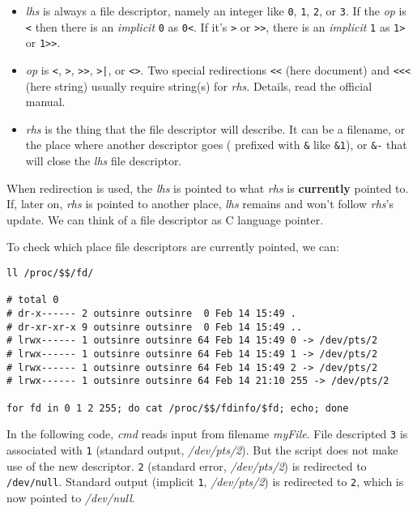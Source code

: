 \begin{itemize}
\item \textit{lhs} is always a file descriptor, namely an integer
  like \verb|0|, \verb|1|, \verb|2|, or \verb|3|. If the
  \textit{op} is \verb|<| then there is an \textit{implicit}
  \verb|0| as \verb|0<|. If it's \verb|>| or \verb|>>|, there is
  an \textit{implicit} \verb|1| as \verb|1>| or \verb|1>>|.
\item \textit{op} is \verb|<|, \verb|>|, \verb|>>|, \verb/>|/, or
  \verb|<>|. Two special redirections \verb|<<| (here document)
  and \verb|<<<| (here string) usually require string(s) for
  \textit{rhs}. Details, read the official manual.
\item \textit{rhs} is the thing that the file descriptor will
  describe. It can be a filename, or the place where another
  descriptor goes ( prefixed with \verb|&| like \lstinline|&1|),
  or \lstinline|&-| that will close the \textit{lhs} file
  descriptor.
\end{itemize}

When redirection is used, the \textit{lhs} is pointed to what
\textit{rhs} is \textbf{currently} pointed to. If, later on,
\textit{rhs} is pointed to another place, \textit{lhs} remains and
won't follow \textit{rhs}'s update. We can think of a file
descriptor as C language pointer.

To check which place file descriptors are currently pointed, we
can:

\begin{lstlisting}
ll /proc/$$/fd/

# total 0
# dr-x------ 2 outsinre outsinre  0 Feb 14 15:49 .
# dr-xr-xr-x 9 outsinre outsinre  0 Feb 14 15:49 ..
# lrwx------ 1 outsinre outsinre 64 Feb 14 15:49 0 -> /dev/pts/2
# lrwx------ 1 outsinre outsinre 64 Feb 14 15:49 1 -> /dev/pts/2
# lrwx------ 1 outsinre outsinre 64 Feb 14 15:49 2 -> /dev/pts/2
# lrwx------ 1 outsinre outsinre 64 Feb 14 21:10 255 -> /dev/pts/2

for fd in 0 1 2 255; do cat /proc/$$/fdinfo/$fd; echo; done
\end{lstlisting}

In the following code, \textit{cmd} reads input from filename
\textit{myFile}. File descripted \verb|3| is associated with
\verb|1| (standard output, \textit{/dev/pts/2}). But the script
does not make use of the new descriptor. \verb|2| (standard error,
\textit{/dev/pts/2}) is redirected to
\lstinline|/dev/null|. Standard output (implicit \verb|1|,
\textit{/dev/pts/2}) is redirected to \verb|2|, which is now
pointed to \textit{/dev/null}.

